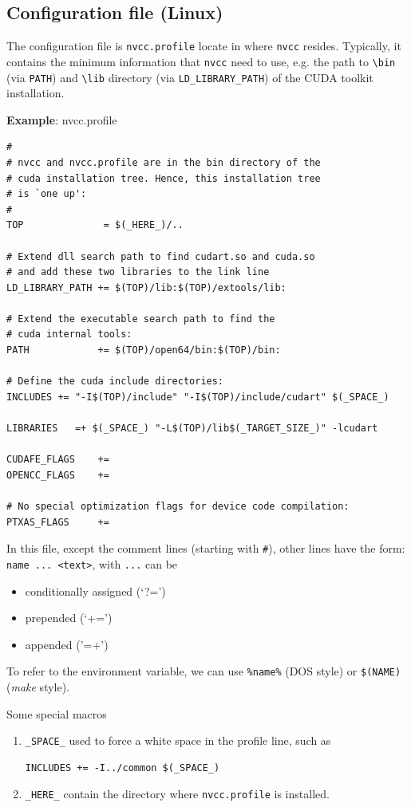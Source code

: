 \subsection{Configuration file (Linux)}
\label{sec:configuration-file}

The configuration file is \verb!nvcc.profile! locate in where
\verb!nvcc! resides. Typically, it contains the minimum information
that \verb!nvcc! need to use, e.g.  the path to \verb!\bin!  (via
\verb!PATH!) and \verb!\lib! directory (via \verb!LD_LIBRARY_PATH!) of
the CUDA toolkit installation.

{\bf Example}: nvcc.profile
\begin{verbatim}
#
# nvcc and nvcc.profile are in the bin directory of the
# cuda installation tree. Hence, this installation tree
# is `one up':
#
TOP              = $(_HERE_)/..

# Extend dll search path to find cudart.so and cuda.so
# and add these two libraries to the link line
LD_LIBRARY_PATH += $(TOP)/lib:$(TOP)/extools/lib:

# Extend the executable search path to find the
# cuda internal tools:
PATH            += $(TOP)/open64/bin:$(TOP)/bin:

# Define the cuda include directories:
INCLUDES += "-I$(TOP)/include" "-I$(TOP)/include/cudart" $(_SPACE_)

LIBRARIES   =+ $(_SPACE_) "-L$(TOP)/lib$(_TARGET_SIZE_)" -lcudart

CUDAFE_FLAGS    +=
OPENCC_FLAGS    +=

# No special optimization flags for device code compilation:
PTXAS_FLAGS     +=
\end{verbatim}
In this file, except the comment lines (starting with \verb!#!), other
lines have the form: \verb!name ... <text>!, with \verb!...! can be
\begin{itemize}
\item conditionally assigned (`?=')
\item prepended (`+=')
\item appended ('=+')
\end{itemize}
To refer to the environment variable, we can use \verb!%name%!
(DOS style) or \verb!$(NAME)! ({\it make} style).

Some special macros
\begin{enumerate}
\item \verb!_SPACE_! used to force a white space in the
profile line, such as
\begin{verbatim}
INCLUDES += -I../common $(_SPACE_)
\end{verbatim}

\item \verb!_HERE_! contain the directory where \verb!nvcc.profile! is
  installed. 
\end{enumerate}


